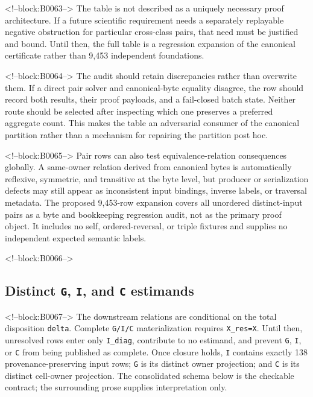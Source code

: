 \documentclass[11pt]{article}
\begin{document}
<!--block:B0063-->
The table is not described as a uniquely necessary proof architecture.
If a future scientific requirement needs a separately replayable
negative obstruction for particular cross-class pairs, that need must be
justified and bound. Until then, the full table is a regression
expansion of the canonical certificate rather than 9,453 independent
foundations.

<!--block:B0064-->
The audit should retain discrepancies rather than overwrite them. If a
direct pair solver and canonical-byte equality disagree, the row should
record both results, their proof payloads, and a fail-closed batch state.
Neither route should be selected after inspecting which one preserves a
preferred aggregate count. This makes the table an adversarial consumer
of the canonical partition rather than a mechanism for repairing the
partition post hoc.

<!--block:B0065-->
Pair rows can also test equivalence-relation consequences globally. A
same-owner relation derived from canonical bytes is automatically
reflexive, symmetric, and transitive at the byte level, but producer or
serialization defects may still appear as inconsistent input bindings,
inverse labels, or traversal metadata. The proposed 9,453-row expansion covers all unordered distinct-input
pairs as a byte and bookkeeping regression audit, not as the primary
proof object. It includes no self, ordered-reversal, or triple fixtures
and supplies no independent expected semantic labels.

<!--block:B0066-->
\hypertarget{44-distinct-g-i-and-c-estimands}{%
\subsection{\texorpdfstring{Distinct \texttt{G}, \texttt{I}, and
\texttt{C}
estimands}{Distinct G, I, and C estimands}}\label{44-distinct-g-i-and-c-estimands}}

<!--block:B0067-->
The downstream relations are conditional on the total disposition
\texttt{delta}.  Complete \texttt{G/I/C} materialization requires
\texttt{X\_res=X}.  Until then, unresolved rows enter only
\texttt{I\_diag}, contribute to no estimand, and prevent \texttt{G},
\texttt{I}, or \texttt{C} from being published as complete.  Once closure holds,
\texttt{I} contains exactly 138 provenance-preserving input rows;
\texttt{G} is its distinct owner projection; and \texttt{C} is its distinct
cell-owner projection.  The consolidated schema below is the checkable contract;
the surrounding prose supplies interpretation only.
\end{document}

